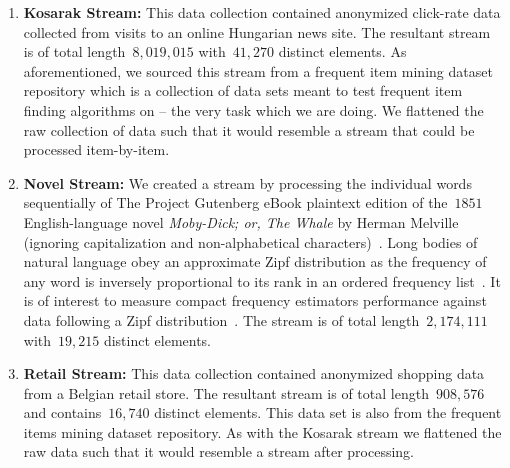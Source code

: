 \begin{enumerate}[wide, labelwidth=!, labelindent=0pt]

    \item \textbf{Kosarak Stream:} This data collection contained anonymized click-rate data collected from visits to an online Hungarian news site. The resultant stream is of total length~$8,019,015$ with~$41,270$ distinct elements. As aforementioned, we sourced this stream from a frequent item mining dataset repository which is a collection of data sets meant to test frequent item finding algorithms on -- the very task which we are doing. We flattened the raw collection of data such that it would resemble a stream that could be processed item-by-item.

    \item \textbf{Novel Stream:} We created a stream by processing the individual words sequentially of The Project Gutenberg eBook plaintext edition of the~$1851$ English-language novel \textit{Moby-Dick; or, The Whale} by Herman Melville (ignoring capitalization and non-alphabetical characters)~\cite{melville1851}. %
    Long bodies of natural language obey an approximate Zipf distribution as the frequency of any word is inversely proportional to its rank in an ordered frequency list~\cite{adamic2002zipf}.  It is of interest to measure compact frequency estimators performance against data following a Zipf distribution~\cite{charikar2002finding,cormode2005s,yang2019heavykeeper,radu2010,metwally2006,manku2002approximate}. The stream is of total length~$2,174,111$ with~$19,215$ distinct elements.
 
    \item \textbf{Retail Stream:} This data collection contained anonymized shopping data from a Belgian retail store. The resultant stream is of total length~$908,576$ and contains~$16,740$ distinct elements. This data set is also from the frequent items mining dataset repository. As with the Kosarak stream we flattened the raw data such that it would resemble a stream after processing. 
\end{enumerate}
